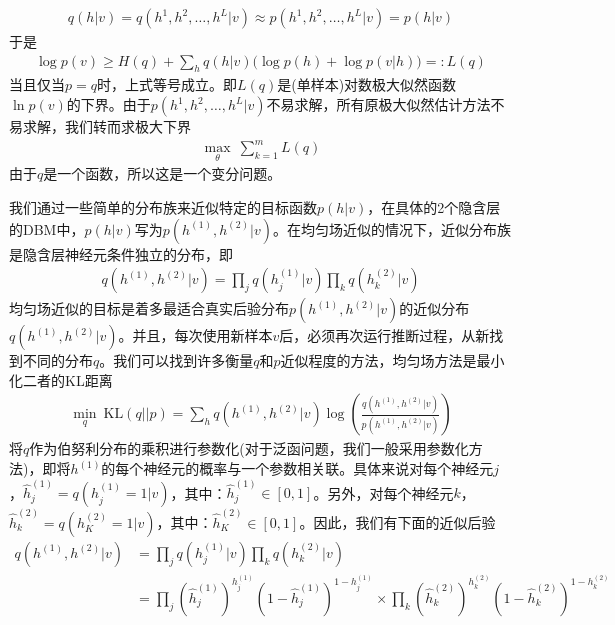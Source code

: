         \begin{align*}
        q(h|v) = q(h^1,h^2,\dots,h^L|v) \approx p(h^1,h^2,\dots,h^L|v) = p(h|v)
        \end{align*}
        于是
        \begin{align*}
        \log p(v)  \geqslant H(q) + \sum_hq(h|v) \Big( \log p(h) + \log p(v|h)\Big) =:L(q)
        \end{align*}
        当且仅当$p = q$时，上式等号成立。即$L(q)$是(单样本)对数极大似然函数$\ln p(v)$的下界。由于$p(h^1,h^2,\dots,h^L|v)$不易求解，所有原极大似然估计方法不易求解，我们转而求极大下界
        \begin{align*}
        \max_\theta  \ \sum_{k=1}^m L(q)
        \end{align*}
        由于$q$是一个函数，所以这是一个变分问题。
        \par
        我们通过一些简单的分布族来近似特定的目标函数$p(h|v)$，在具体的2个隐含层的DBM中，$p(h|v)$写为$p(h^{(1)},h^{(2)}|v)$。在均匀场近似的情况下，近似分布族是隐含层神经元条件独立的分布，即
        \begin{align*}
        q(h^{(1)},h^{(2)}|v) = \prod_{j} q(h_j^{(1)}|v) \prod_kq(h_k^{(2)}|v)
        \end{align*}
        均匀场近似的目标是着多最适合真实后验分布$p(h^{(1)},h^{(2)}|v)$的近似分布$q(h^{(1)},h^{(2)}|v)$。并且，每次使用新样本$v$后，必须再次运行推断过程，从新找到不同的分布$q$。我们可以找到许多衡量$q$和$p$近似程度的方法，均匀场方法是最小化二者的KL距离
        \begin{align*}
        \min_q \ \mathrm{KL}(q||p) = \sum_hq(h^{(1)},h^{(2)}|v) \log \left( \frac{q(h^{(1)},h^{(2)}|v)}{p( h^{(1)},h^{(2)}|v)} \right)
        \end{align*}
        将$q$作为伯努利分布的乘积进行参数化(对于泛函问题，我们一般采用参数化方法)，即将$h^{(1)}$的每个神经元的概率与一个参数相关联。具体来说对每个神经元$j$，$\hat{h}_j^{(1)} = q(h_j^{(1)}=1|v)$，其中：$\hat{h}_j^{(1)}\in [0,1]$。另外，对每个神经元$k$，$\hat{h}_k^{(2)} = q(h_K^{(2)}=1|v)$，其中：$\hat{h}_K^{(2)}\in [0,1]$。因此，我们有下面的近似后验
        \begin{align*}
        q(h^{(1)},h^{(2)}|v) & = \prod_{j} q(h_j^{(1)}|v) \prod_kq(h_k^{(2)}|v)\\
        & =\prod_j \left( \hat{h}_j^{(1)} \right) ^{h_j^{(1)}} \left( 1- \hat{h}_j^{(1)}\right) ^{1- h_j^{(1)}} \times  \prod_k \left( \hat{h}_k^{(2)} \right) ^{h_k^{(2)}} \left( 1- \hat{h}_k^{(2)}\right) ^{1- h_k^{(2)}}
        \end{align*}
